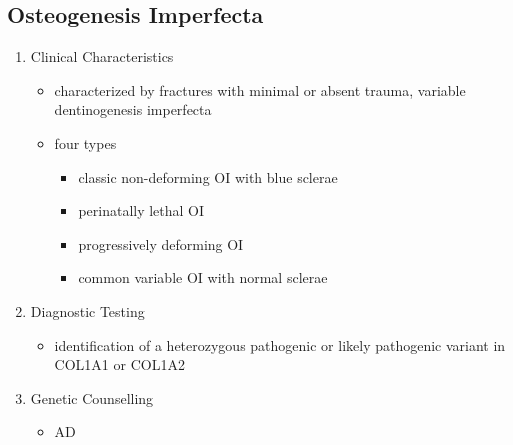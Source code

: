 \documentclass[12pt]{scrartcl}
\begin{document}
\subsection{Osteogenesis Imperfecta}
\label{sec:org00f8afe}
\begin{enumerate}
\item Clinical Characteristics
\label{sec:org7aede32}
\begin{itemize}
\item characterized by fractures with minimal or absent trauma, variable
dentinogenesis imperfecta
\item four types
\begin{itemize}
\item classic non-deforming OI with blue sclerae
\item perinatally lethal OI
\item progressively deforming OI
\item common variable OI with normal sclerae
\end{itemize}
\end{itemize}

\item Diagnostic Testing
\label{sec:orgac831df}
\begin{itemize}
\item identification of a heterozygous pathogenic or likely pathogenic
variant in COL1A1 or COL1A2
\end{itemize}
\item Genetic Counselling
\label{sec:orgc3ff826}
\begin{itemize}
\item AD
\end{itemize}
\end{enumerate}
\end{document}
